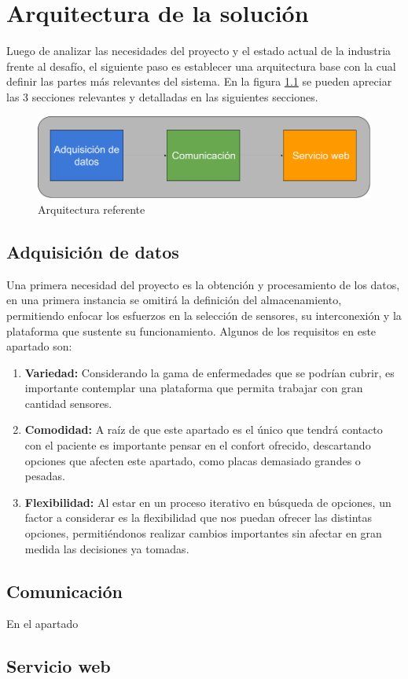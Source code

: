 \chapter{Arquitectura de la solución}\label{arquitectura}

Luego de analizar las necesidades del proyecto y el estado actual de la industria frente al desafío, el siguiente paso es establecer una arquitectura base con la cual definir las partes más relevantes del sistema. En la figura \ref{arqui} se pueden apreciar las 3 secciones relevantes y detalladas en las siguientes secciones.

\begin{figure}[H]
	\centering
	\includegraphics[scale=0.43]{figuras/arquitectura/arqui.png}
	\caption{Arquitectura referente}
	\label{arqui}
\end{figure}

\newpage
\section{Adquisición de datos}
Una primera necesidad del proyecto es la obtención y procesamiento de los datos, en una primera instancia se omitirá la definición del almacenamiento, permitiendo enfocar los esfuerzos en la selección de sensores, su interconexión y la plataforma que sustente su funcionamiento. Algunos de los requisitos en este apartado son:

\begin{enumerate}
	\item \textbf{Variedad:}
	Considerando la gama de enfermedades que se podrían cubrir, es importante contemplar una plataforma que permita trabajar con gran cantidad sensores.
	\item \textbf{Comodidad:}
	A raíz de que este apartado es el único que tendrá contacto con el paciente es importante pensar en el confort ofrecido, descartando opciones que afecten este apartado, como placas demasiado grandes o pesadas.
	\item \textbf{Flexibilidad:}
	Al estar en un proceso iterativo en búsqueda de opciones, un factor a considerar es la flexibilidad que nos puedan ofrecer las distintas opciones, permitiéndonos realizar cambios importantes sin afectar en gran medida las decisiones ya tomadas.
\end{enumerate}

\newpage
\section{Comunicación}
En el apartado 

\newpage
\section{Servicio web}

